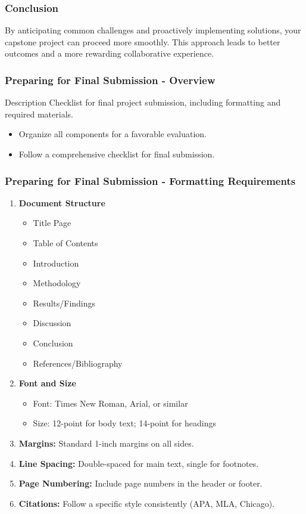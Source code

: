 \documentclass[aspectratio=169]{beamer}
\begin{document}
\begin{frame}[fragile]
    \frametitle{Conclusion}
    By anticipating common challenges and proactively implementing solutions, your capstone project can proceed more smoothly. This approach leads to better outcomes and a more rewarding collaborative experience.
\end{frame}

\begin{frame}[fragile]
    \frametitle{Preparing for Final Submission - Overview}
    \begin{block}{Description}
        Checklist for final project submission, including formatting and required materials.
    \end{block}

    \begin{itemize}
        \item Organize all components for a favorable evaluation.
        \item Follow a comprehensive checklist for final submission.
    \end{itemize}
\end{frame}

\begin{frame}[fragile]
    \frametitle{Preparing for Final Submission - Formatting Requirements}
    \begin{enumerate}
        \item \textbf{Document Structure}
            \begin{itemize}
                \item Title Page
                \item Table of Contents
                \item Introduction
                \item Methodology
                \item Results/Findings
                \item Discussion
                \item Conclusion
                \item References/Bibliography
            \end{itemize}
        \item \textbf{Font and Size}
            \begin{itemize}
                \item Font: Times New Roman, Arial, or similar
                \item Size: 12-point for body text; 14-point for headings
            \end{itemize}
        \item \textbf{Margins:} Standard 1-inch margins on all sides.
        \item \textbf{Line Spacing:} Double-spaced for main text, single for footnotes.
        \item \textbf{Page Numbering:} Include page numbers in the header or footer.
        \item \textbf{Citations:} Follow a specific style consistently (APA, MLA, Chicago).
    \end{enumerate}
\end{frame}
\end{document}
